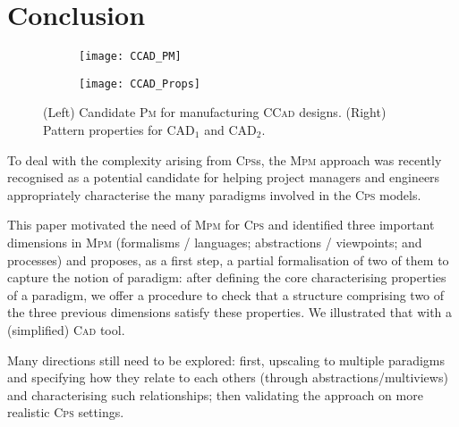 \section{Conclusion}
\label{sec:Conclusion}

\begin{figure}[t]
\centering
\begin{subfigure}[t]{0.72\linewidth}
\centering
\texttt{[image: CCAD\_PM]}
\label{fig:CCAD-PM-Full}%
\end{subfigure}
\begin{subfigure}[t]{0.23\linewidth}
\centering
\texttt{[image: CCAD\_Props]}
\label{fig:PatternProperties}
\end{subfigure}
\caption{(Left) Candidate \textsc{Pm} for manufacturing \textsc{CCad} designs.
(Right) Pattern properties for $\mbox{CAD}_1$ and $\mbox{CAD}_2$.}
\end{figure}

To deal with the complexity arising from \textsc{Cps}s, the \textsc{Mpm} 
approach was recently recognised as a potential candidate for helping project 
managers and engineers appropriately characterise the many paradigms involved 
in the \textsc{Cps} models. 

This paper motivated the need of \textsc{Mpm} for \textsc{Cps} and identified 
three important dimensions in \textsc{Mpm} (formalisms / languages; 
abstractions / viewpoints; and processes) and proposes, as a first step, a 
partial formalisation of two of them to capture the notion of paradigm: after 
defining the core characterising properties of a paradigm, we offer a procedure 
to check that a structure comprising two of the three previous dimensions 
satisfy these properties. We illustrated that with a (simplified) \textsc{Cad} 
tool. 

Many directions still need to be explored: first, upscaling to multiple 
paradigms and specifying how they relate to each others (through 
abstractions/multiviews) and characterising such relationships; then validating 
the approach on more realistic \textsc{Cps} settings. 


